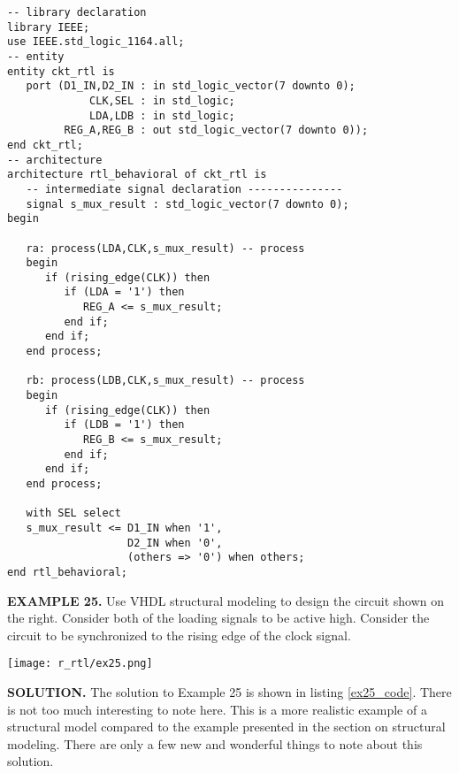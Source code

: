 \noindent
\begin{minipage}{0.99\linewidth}
\begin{lstlisting}[label=ex24_code, caption=Solution to Example 24.]
-- library declaration
library IEEE;
use IEEE.std_logic_1164.all;
-- entity
entity ckt_rtl is
   port (D1_IN,D2_IN : in std_logic_vector(7 downto 0);
             CLK,SEL : in std_logic; 
             LDA,LDB : in std_logic; 
         REG_A,REG_B : out std_logic_vector(7 downto 0)); 
end ckt_rtl; 
-- architecture
architecture rtl_behavioral of ckt_rtl is 
   -- intermediate signal declaration ---------------
   signal s_mux_result : std_logic_vector(7 downto 0);
begin

   ra: process(LDA,CLK,s_mux_result) -- process
   begin
      if (rising_edge(CLK)) then 
         if (LDA = '1') then 
            REG_A <= s_mux_result; 
         end if;
      end if;
   end process; 
	
   rb: process(LDB,CLK,s_mux_result) -- process
   begin
      if (rising_edge(CLK)) then 
         if (LDB = '1') then 
            REG_B <= s_mux_result; 
         end if;
      end if;
   end process; 
	
   with SEL select
   s_mux_result <= D1_IN when '1', 
                   D2_IN when '0', 
                   (others => '0') when others; 
end rtl_behavioral;
\end{lstlisting}
\end{minipage}

\begin{leftbar}
\begin{minipage}[t]{0.5\textwidth}
\vspace{10pt}
\noindent
\textbf{EXAMPLE 25.}
Use VHDL structural modeling to design the circuit shown on the right. Consider both of the loading signals to be active high. Consider the circuit to be synchronized to the rising edge of the clock signal.
\end{minipage}
\begin{minipage}[t]{0.5\textwidth}
\vspace{0pt}\raggedright
    \centering
	\texttt{[image: r\_rtl/ex25.png]}
\end{minipage}
\end{leftbar}
\noindent
\textbf{SOLUTION.} The solution to Example 25 is shown in listing \ref{ex25_code}. There is not too much interesting to note here. This is a more realistic example of a structural model compared to the example presented in the section on structural modeling. There are only a few new and wonderful things to note about this solution.

